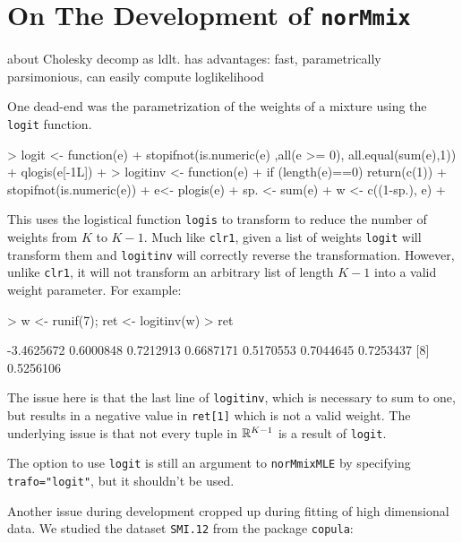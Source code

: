 \section{On The Development of {\tt norMmix}}
\label{sec:devel}

about Cholesky decomp as ldlt. has advantages: fast, parametrically 
parsimonious, can easily compute loglikelihood


One dead-end was the parametrization of the weights of a mixture using the 
{\tt logit} function.

\begin{Schunk}
\begin{Sinput}
> logit <- function(e) {
+     stopifnot(is.numeric(e) ,all(e >= 0), all.equal(sum(e),1))
+     qlogis(e[-1L])
+ }
> logitinv <- function(e) {
+     if (length(e)==0) {return(c(1))}
+     stopifnot(is.numeric(e))
+     e<- plogis(e)
+     sp. <- sum(e)
+     w <- c((1-sp.), e)
+ }
\end{Sinput}
\end{Schunk}

This uses the logistical function {\tt logis} to transform to reduce the number
of weights from $K$ to $K-1$. Much like {\tt clr1}, given a list of weights 
{\tt logit} will transform them and {\tt logitinv} will correctly reverse the 
transformation. However, unlike {\tt clr1}, it will not transform an arbitrary 
list of length $K-1$ into a valid weight parameter. For example:

\begin{Schunk}
\begin{Sinput}
> w <- runif(7); ret <- logitinv(w)
> ret
\end{Sinput}
\begin{Soutput}
[1] -3.4625672  0.6000848  0.7212913  0.6687171  0.5170553  0.7044645  0.7253437
[8]  0.5256106
\end{Soutput}
\end{Schunk}

The issue here is that the last line of {\tt logitinv}, which is necessary to 
sum to one, but results in a negative value in {\tt ret[1]} which is not a 
valid weight. The underlying issue is that not every tuple in $\mathbb{R}^{K-1}$ is 
a result of {\tt logit}.

The option to use {\tt logit} is still an argument to {\tt norMmixMLE} by 
specifying {\tt trafo="logit"}, but it shouldn't be used.



Another issue during development cropped up during fitting of high dimensional
data. We studied the dataset {\tt SMI.12} from the package {\tt copula}:

